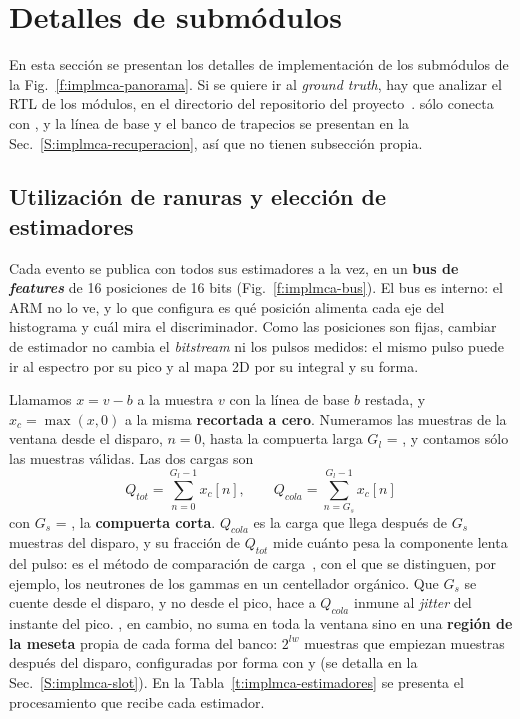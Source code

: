 \section{Detalles de submódulos}
\label{S:implmca-submodulos}

En esta sección se presentan los detalles de implementación de los submódulos
de la Fig.~\ref{f:implmca-panorama}. Si se quiere ir al \emph{ground truth}, hay
que analizar el RTL de los módulos, en el directorio 
del repositorio del proyecto~\cite{RepoMultitrigger}.
 sólo conecta  con
, y la línea de base y el banco de trapecios se presentan en
la Sec.~\ref{S:implmca-recuperacion}, así que no tienen subsección propia.

\subsection{Utilización de ranuras y elección de estimadores}
\label{S:implmca-estimadores}

Cada evento se publica con todos sus estimadores a la vez, en un \textbf{bus de
\emph{features}} de 16 posiciones de 16 bits (Fig.~\ref{f:implmca-bus}). El bus es
interno: el ARM no lo ve, y lo que configura es qué posición alimenta cada eje
del histograma y cuál mira el discriminador. Como las posiciones son fijas,
cambiar de estimador no cambia el \emph{bitstream} ni los pulsos medidos: el mismo
pulso puede ir al espectro por su pico y al mapa 2D por su integral y su forma.

Llamamos $x = v - b$ a la muestra $v$ con la línea de base $b$ restada, y
$x_c = \max(x, 0)$ a la misma \textbf{recortada a cero}. Numeramos las muestras
de la ventana desde el disparo, $n = 0$, hasta la compuerta larga $G_l$ =
, y contamos sólo las muestras válidas. Las dos cargas son
\begin{equation}
  Q_{tot} = \sum_{n=0}^{G_l-1} x_c[n], \qquad Q_{cola} = \sum_{n=G_s}^{G_l-1}
  x_c[n]
  \label{e:implmca-cargas}
\end{equation}
con $G_s$ = , la \textbf{compuerta corta}. $Q_{cola}$ es la
carga que llega después de $G_s$ muestras del disparo, y su fracción de
$Q_{tot}$ mide cuánto pesa la componente lenta del pulso: es el método de
comparación de carga~\cite{Brooks1959}, con el que se distinguen, por ejemplo,
los neutrones de los gammas en un centellador orgánico. Que $G_s$ se cuente
desde el disparo, y no desde el pico, hace a $Q_{cola}$ inmune al \emph{jitter} del
instante del pico. , en cambio, no suma en toda la ventana sino
en una \textbf{región de la meseta} propia de cada forma del banco: $2^{lw}$
muestras que empiezan  muestras después del disparo, configuradas
por forma con  y  (se detalla en la
Sec.~\ref{S:implmca-slot}). En la Tabla~\ref{t:implmca-estimadores} se presenta
el procesamiento que recibe cada estimador.

